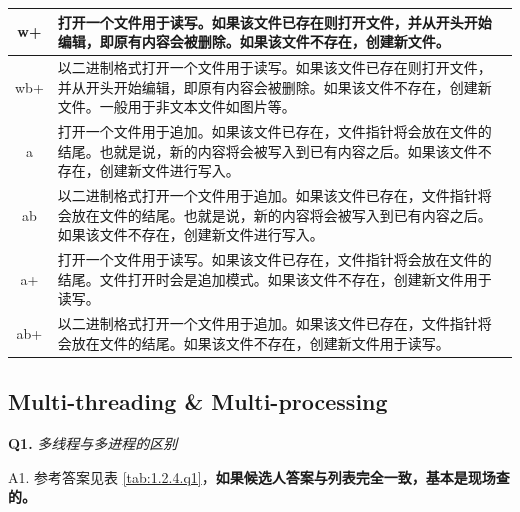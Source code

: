 \documentclass[cn,10pt,math=newtx,citestyle=gb7714-2015,bibstyle=gb7714-2015]{elegantbook}
\begin{document}
\begin{table}[ht]
\begin{tabular}{|c|m{15cm}|}
\rowcolor[HTML]{F6F4F0} 
{\color[HTML]{333333} w+}          & {\color[HTML]{333333} 打开一个文件用于读写。如果该文件已存在则打开文件，并从开头开始编辑，即原有内容会被删除。如果该文件不存在，创建新文件。}                      \\ \hline
\rowcolor[HTML]{FFFFFF} 
{\color[HTML]{333333} wb+}         & {\color[HTML]{333333} 以二进制格式打开一个文件用于读写。如果该文件已存在则打开文件，并从开头开始编辑，即原有内容会被删除。如果该文件不存在，创建新文件。一般用于非文本文件如图片等。}  \\ \hline
\rowcolor[HTML]{F6F4F0} 
{\color[HTML]{333333} a}           & {\color[HTML]{333333} 打开一个文件用于追加。如果该文件已存在，文件指针将会放在文件的结尾。也就是说，新的内容将会被写入到已有内容之后。如果该文件不存在，创建新文件进行写入。}      \\ \hline
\rowcolor[HTML]{FFFFFF} 
{\color[HTML]{333333} ab} & {\color[HTML]{333333} 以二进制格式打开一个文件用于追加。如果该文件已存在，文件指针将会放在文件的结尾。也就是说，新的内容将会被写入到已有内容之后。如果该文件不存在，创建新文件进行写入。} \\ \hline
\rowcolor[HTML]{F6F4F0} 
{\color[HTML]{333333} a+}          & {\color[HTML]{333333} 打开一个文件用于读写。如果该文件已存在，文件指针将会放在文件的结尾。文件打开时会是追加模式。如果该文件不存在，创建新文件用于读写。}                \\ \hline
\rowcolor[HTML]{FFFFFF} 
{\color[HTML]{333333} ab+}         & {\color[HTML]{333333} 以二进制格式打开一个文件用于追加。如果该文件已存在，文件指针将会放在文件的结尾。如果该文件不存在，创建新文件用于读写。}                      \\ \hline
\end{tabular}
\label{tab:1.2.3.q1}%
\end{table}


\subsection{Multi-threading \& Multi-processing}

\textbf{Q1.} \textit{多线程与多进程的区别}

A1. 参考答案见表 \ref{tab:1.2.4.q1}，\textbf{如果候选人答案与列表完全一致，基本是现场查的。}
\end{document}
